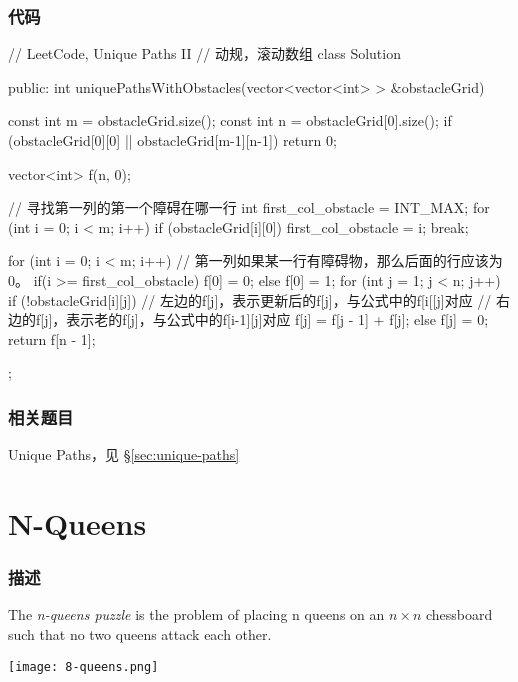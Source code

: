 \subsubsection{代码}
\begin{Code}
// LeetCode, Unique Paths II
// 动规，滚动数组
class Solution {
public:
    int uniquePathsWithObstacles(vector<vector<int> > &obstacleGrid) {
        const int m = obstacleGrid.size();
        const int n = obstacleGrid[0].size();
        if (obstacleGrid[0][0] || obstacleGrid[m-1][n-1]) return 0;

        vector<int> f(n, 0);

        // 寻找第一列的第一个障碍在哪一行
        int first_col_obstacle = INT_MAX;
        for (int i = 0; i < m; i++) {
            if (obstacleGrid[i][0]) {
                first_col_obstacle = i;
                break;
            }
        }

        for (int i = 0; i < m; i++) {
            // 第一列如果某一行有障碍物，那么后面的行应该为0。
            if(i >= first_col_obstacle) f[0] = 0;
            else f[0] = 1;
            for (int j = 1; j < n; j++) {
                if (!obstacleGrid[i][j]) {
                    // 左边的f[j]，表示更新后的f[j]，与公式中的f[i[[j]对应
                    // 右边的f[j]，表示老的f[j]，与公式中的f[i-1][j]对应
                    f[j] = f[j - 1] + f[j];
                } else {
                    f[j] = 0;
                }
            }
        }
        return f[n - 1];
    }
};
\end{Code}


\subsubsection{相关题目}
\begindot
\item Unique Paths，见 \S \ref{sec:unique-paths}
\myenddot


\section{N-Queens} %
\label{sec:n-queens}


\subsubsection{描述}
The \emph{n-queens puzzle} is the problem of placing n queens on an $n \times n$ chessboard such that no two queens attack each other.

\begin{center}
\texttt{[image: 8-queens.png]}\\
\label{fig:8-queens}
\end{center}

